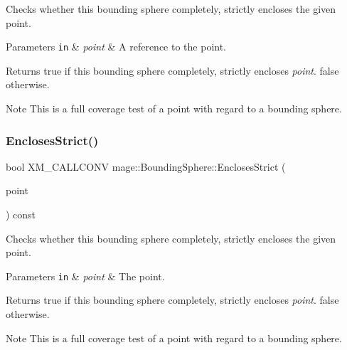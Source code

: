 Checks whether this bounding sphere completely, strictly encloses the given point.


\begin{DoxyParams}[1]{Parameters}
\mbox{\tt in}  & {\em point} & A reference to the point. \\
\hline
\end{DoxyParams}
\begin{DoxyReturn}{Returns}
{\ttfamily true} if this bounding sphere completely, strictly encloses {\itshape point}. {\ttfamily false} otherwise. 
\end{DoxyReturn}
\begin{DoxyNote}{Note}
This is a full coverage test of a point with regard to a bounding sphere. 
\end{DoxyNote}
\hypertarget{classmage_1_1_bounding_sphere_ad75f41a261dd2e366457543b6150718a}{}\label{classmage_1_1_bounding_sphere_ad75f41a261dd2e366457543b6150718a} 
\subsubsection{\texorpdfstring{Encloses\+Strict()}{EnclosesStrict()}\hspace{0.1cm}{\footnotesize\ttfamily [2/4]}}
{\footnotesize\ttfamily bool X\+M\+\_\+\+C\+A\+L\+L\+C\+O\+NV mage\+::\+Bounding\+Sphere\+::\+Encloses\+Strict (\begin{DoxyParamCaption}\item[{F\+X\+M\+V\+E\+C\+T\+OR}]{point }\end{DoxyParamCaption}) const\hspace{0.3cm}{\ttfamily [noexcept]}}

Checks whether this bounding sphere completely, strictly encloses the given point.


\begin{DoxyParams}[1]{Parameters}
\mbox{\tt in}  & {\em point} & The point. \\
\hline
\end{DoxyParams}
\begin{DoxyReturn}{Returns}
{\ttfamily true} if this bounding sphere completely, strictly encloses {\itshape point}. {\ttfamily false} otherwise. 
\end{DoxyReturn}
\begin{DoxyNote}{Note}
This is a full coverage test of a point with regard to a bounding sphere. 
\end{DoxyNote}
\hypertarget{classmage_1_1_bounding_sphere_ac1598f0dcef439855f203fbd6357e6f7}{}\label{classmage_1_1_bounding_sphere_ac1598f0dcef439855f203fbd6357e6f7} 
